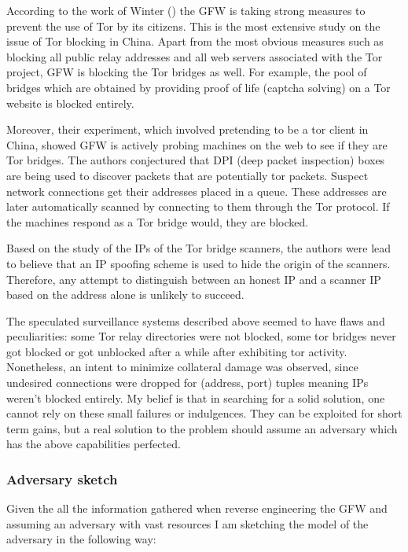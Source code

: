 \documentclass[11pt]{book} %
\begin{document}
According to the work of Winter (\citep*{winterInChina}) the GFW is taking strong measures to prevent the use of Tor by its citizens. This is the most extensive study on the issue of Tor blocking in China. Apart from the most obvious measures such as blocking all public relay addresses and all web servers associated with the Tor project, GFW is blocking the Tor bridges as well. For example, the pool of bridges which are obtained by providing proof of life (captcha solving) on a Tor website is blocked entirely. 

Moreover, their experiment, which involved pretending to be a tor client in China, showed GFW is actively probing machines on the web to see if they are Tor bridges. The authors conjectured that DPI (deep packet inspection) boxes are being used to discover packets that are potentially tor packets. Suspect network connections get their addresses placed in a queue. These addresses are later automatically scanned by connecting to them through the Tor protocol. If the machines respond as a Tor bridge would, they are blocked.

Based on the study of the IPs of the Tor bridge scanners, the authors were lead to believe that an IP spoofing scheme is used to hide the origin of the scanners. Therefore, any attempt to distinguish between an honest IP and a scanner IP based on the address alone is unlikely to succeed. 

The speculated surveillance systems described above seemed to have flaws and peculiarities: some Tor relay directories were not blocked, some tor bridges never got blocked or got unblocked after a while after exhibiting tor activity. Nonetheless, an intent to minimize collateral damage was observed, since undesired connections were dropped for (address, port) tuples meaning IPs weren’t blocked entirely.  My belief is that in searching for a solid solution, one cannot rely on these small failures or indulgences. They can be exploited for short term gains, but a real solution to the problem should assume an adversary which has the above capabilities perfected.

\subsubsection{Adversary sketch}

Given the all the information gathered when reverse engineering the GFW and assuming an adversary with vast resources I am sketching the model of the adversary in the following way:
\end{document}
